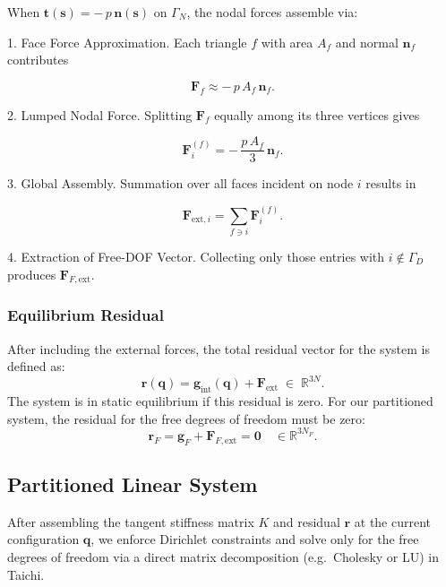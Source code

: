 \documentclass{article}
\begin{document}
When $\mathbf t(\mathbf s) = -\,p\,\mathbf n(\mathbf s)$ on $\Gamma_N$, the nodal forces assemble via:

1. Face Force Approximation.
   Each triangle $f$ with area $A_f$ and normal $\mathbf n_f$ contributes

   $$
     \mathbf F_f \approx -\,p\,A_f\,\mathbf n_f.
   $$

2. Lumped Nodal Force.
   Splitting $\mathbf F_f$ equally among its three vertices gives

   $$
     \mathbf F_i^{(f)} = -\,\frac{p\,A_f}{3}\,\mathbf n_f.
   $$

3. Global Assembly.
   Summation over all faces incident on node $i$ results in

   $$
     \mathbf F_{\mathrm{ext},i} = \sum_{f\ni i}\mathbf F_i^{(f)}.
   $$

4. Extraction of Free-DOF Vector.
   Collecting only those entries with $i\notin\Gamma_D$ produces $\mathbf F_{F,\mathrm{ext}}$.

\subsubsection{Equilibrium Residual}

After including the external forces, the total residual vector for the system is defined as:
\[
  \mathbf{r}(\mathbf{q}) = \mathbf{g}_{\text{int}}(\mathbf{q}) + \mathbf{F}_{\text{ext}} \;\in\;\mathbb{R}^{3N}.
\]
The system is in static equilibrium if this residual is zero. For our partitioned system, the residual for the free degrees of freedom must be zero:
\[
    \mathbf{r}_F = \mathbf{g}_F + \mathbf{F}_{F,\text{ext}} = \mathbf{0} \quad \in \mathbb{R}^{3N_F}.
\]



\subsection{Partitioned Linear System}

After assembling the tangent stiffness matrix \(K\) and residual \(\mathbf r\) at the current configuration \(\mathbf q\), we enforce Dirichlet constraints and solve only for the free degrees of freedom via a direct matrix decomposition (e.g.\ Cholesky or LU) in Taichi.
\end{document}
